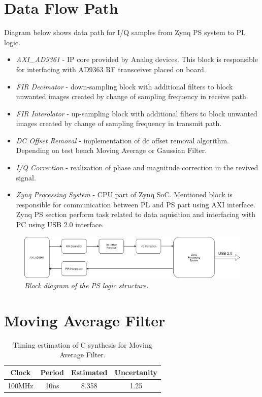 \documentclass[en,printmode]{mgr}
\begin{document}
	\section{Data Flow Path}
	Diagram below shows data path for I/Q samples from Zynq PS system to PL logic.
	
	\begin{itemize}
		\item \textit{AXI_AD9361} - IP core provided by Analog devices. This block is responsible for
			interfacing with AD9363 RF transceiver placed on board. 
		\item \textit{FIR Decimator} - down-sampling block with additional filters to block unwanted
			images created by change of sampling frequency in receive path.
		\item \textit{FIR Interolator} - up-sampling block with additional filters to block unwanted
			images created by change of sampling frequency in transmit path.
		\item \textit{DC Offset Removal} - implementation of dc offset removal algorithm. 
			Depending on test bench Moving Average or Gaussian Filter.
		\item \textit{I/Q Correction} - realization of phase and magnitude correction in the revived
		 	signal.
		\item \textit{Zynq Processing System} - CPU part of Zynq SoC. Mentioned block is responsible for
			communication between PL and PS part using AXI interface. Zynq PS section perform task
			related to data aquisition and interfacing with PC using USB 2.0 interface.
	\end{itemize}
	
	\begin{figure}[H]
    	\centering
   		\includegraphics[width=\textheight, angle =90]{diag/hdl.png}
    	\caption{\textit{Block diagram of the PS logic structure.}}
    	\label{fig:polarplot}
	\end{figure}
	
	\section{Moving Average Filter}
	\begin{table}[H]
		\centering
		\caption{}
		\begin{tabular}{|c|c|c|c|}
		\hline
		Clock  & Period & Estimated & Uncertanity \\ \hline
		100MHz & 10ns   & 8.358     & 1.25        \\ \hline
		\end{tabular}
		\caption{Timing estimation of C synthesis for Moving Average Filter.}
	\end{table}
	
\end{document}
